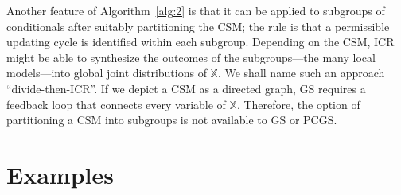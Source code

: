 \documentclass[12pt,a4paper]{article}
\begin{document}
Another feature of  Algorithm~\ref{alg:2} is that it  can be applied to subgroups of conditionals
after suitably partitioning the CSM;
the rule is that a permissible updating cycle is identified within each subgroup.
Depending on the CSM, ICR might
be able to synthesize the outcomes of the subgroups---the many local models---into global
joint distributions of ${\mathbb X}$.  We shall name such an approach ``divide-then-ICR''.
If we depict a CSM as a directed graph,
GS requires a feedback loop that connects every variable of $\mathbb{X}$.
Therefore, the option of partitioning a CSM into subgroups is not available to GS or PCGS.



\section{Examples}\label{sec:3}
\end{document}
